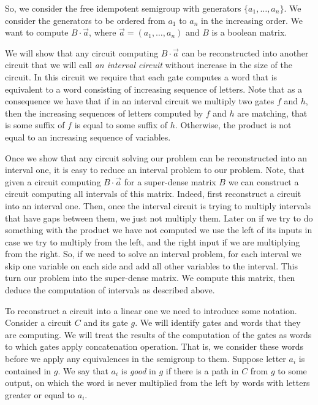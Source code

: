 \documentclass[11pt,letterpaper]{article}
\begin{document}
So, we consider the free idempotent semigroup with generators $\{a_1,\ldots, a_n\}$.
We consider the generators to be ordered from $a_1$ to $a_n$ in the increasing order. We want to compute $B \cdot \vec{a}$, where $\vec{a}=(a_1,\ldots, a_n)$ and $B$ is a boolean matrix.

We will show that any circuit computing $B \cdot \vec{a}$ can be reconstructed into another circuit that we will call \emph{an interval circuit} without increase in the size of the circuit. In this circuit we require that each gate computes a word that is equivalent to a word consisting of increasing sequence of letters. Note that as a consequence we have that if in an interval circuit we multiply two gates $f$ and $h$, then the increasing sequences of letters computed by $f$ and $h$ are matching, that is some suffix of $f$ is equal to some suffix of $h$. Otherwise, the product is not equal to an increasing sequence of variables.

Once we show that any circuit solving our problem can be reconstructed into an interval one, it is easy to reduce an interval problem to our problem. Note, that given a circuit computing $B \cdot \vec{a}$ for a super-dense matrix $B$ we can construct a circuit computing all intervals of this matrix. Indeed, first reconstruct a circuit into an interval one. Then, once the interval circuit is trying to multiply intervals that have gaps  between them, we just not multiply them. Later on if we try to do something with the product we have not computed we use the left of its inputs in case we try to multiply from the left, and the right input if we are multiplying from the right. So, if we need to solve an interval problem, for each interval we skip one variable on each side and add all other variables to the interval. This turn our problem into the super-dense matrix. We compute this matrix, then deduce the computation of intervals as described above.


To reconstruct a circuit into a linear one we need to introduce some notation. Consider a circuit $C$ and its gate $g$.
We will identify gates and words that they are computing. We will treat the results of the computation of the gates as words to which gates apply concatenation operation. That is, we consider these words before we apply any equivalences in the semigroup to them.
Suppose letter $a_i$ is contained in $g$. We say that $a_i$ is \emph{good} in $g$ if there is a path in $C$ from $g$ to some output, on which the word is never multiplied from the left by words with letters greater or equal to $a_i$.
\end{document}
